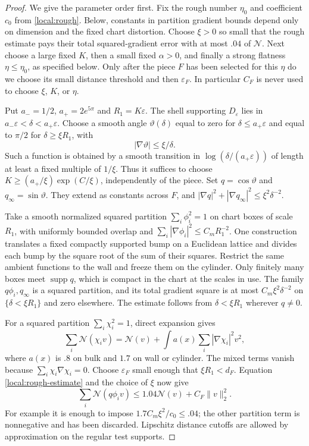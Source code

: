 \documentclass[11pt]{article}
\numberwithin{equation}{section}
\theoremstyle{definition}
\theoremstyle{remark}
\begin{document}
\begin{proof}
We give the parameter order first.  Fix the rough number $\eta_0$
and coefficient $c_0$ from \cref{local:rough}.  Below, constants in
partition gradient bounds depend only on dimension and the fixed
chart distortion.  Choose $\xi>0$ so small that the rough estimate
pays their total squared-gradient error with at most $.04$ of
$\mathcal N$.  Next choose a large fixed $K$, then a small fixed
$\alpha>0$, and finally a strong flatness $\eta\le\eta_0$, as
specified below.  Only after the piece $F$ has been selected for
this $\eta$ do we choose its small distance threshold and then
$\varepsilon_F$.  In particular $C_F$ is never used to choose
$\xi$, $K$, or $\eta$.

Put $a_-=1/2$, $a_+=2e^{5\pi}$ and $R_1=K\varepsilon$.
The shell supporting $D_\varepsilon$ lies in
$a_-\varepsilon<\delta<a_+\varepsilon$.
Choose a smooth angle $\vartheta(\delta)$ equal to zero for
$\delta\le a_+\varepsilon$ and equal to $\pi/2$ for
$\delta\ge\xi R_1$, with
\[
 |\nabla\vartheta|\le\xi/\delta.
\]
Such a function is obtained by a smooth transition in
$\log(\delta/(a_+\varepsilon))$ of length at least a fixed multiple
of $1/\xi$.  Thus it suffices to choose
$K\ge (a_+/\xi)\exp(C/\xi)$, independently of the piece.  Set
$q=\cos\vartheta$ and $q_\infty=\sin\vartheta$.
They extend as constants across $F$, and
$|\nabla q|^2+|\nabla q_\infty|^2\le\xi^2\delta^{-2}$.

Take a smooth normalized squared partition $\sum_i\phi_i^2=1$
on chart boxes of scale $R_1$, with uniformly bounded overlap and
$\sum_i|\nabla\phi_i|^2\le C_mR_1^{-2}$.
One construction translates a fixed compactly supported bump on a
Euclidean lattice and divides each bump by the square root of the
sum of their squares.  Restrict the same ambient functions to the
wall and freeze them on the cylinder.  Only finitely many boxes
meet $\operatorname{supp} q$, which is compact in the chart at the scales in use.
The family $q\phi_i,q_\infty$ is a squared partition, and its total
gradient square is at most $C_m\xi^2\delta^{-2}$ on
$\{\delta<\xi R_1\}$ and zero elsewhere.  The estimate follows
from $\delta<\xi R_1$ wherever $q\ne0$.

For a squared partition $\sum_i\chi_i^2=1$, direct expansion gives
\begin{equation}\label{local:IMS}
 \sum_i\mathcal N(\chi_iv)
 =\mathcal N(v)+
   \int a(x)\sum_i|\nabla\chi_i|^2v^2,
\end{equation}
where $a(x)$ is $.8$ on bulk and $1.7$ on wall or cylinder.
The mixed terms vanish because $\sum_i\chi_i\nabla\chi_i=0$.
Choose $\varepsilon_F$ small enough that $\xi R_1<d_F$.
Equation \eqref{local:rough-estimate} and the choice of $\xi$ now
give
\begin{equation}\label{local:localization}
 \sum_i\mathcal N(q\phi_iv)
 \le1.04\mathcal N(v)+C_F\|v\|_2^2.
\end{equation}
For example it is enough to impose
$1.7C_m\xi^2/c_0\le.04$; the other partition term is nonnegative
and has been discarded.  Lipschitz distance cutoffs are allowed by
approximation on the regular test supports.


\end{proof}
\end{document}
